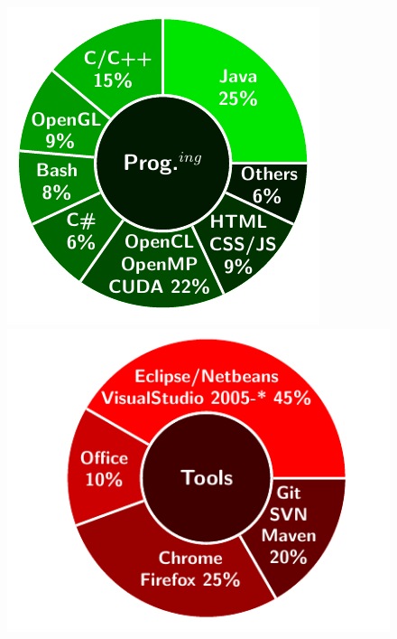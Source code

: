 

\begin{figure}[!htb]
\centering
\includegraphics[scale=0.834]{resume/pie_charts/pie_chart_programming.pdf} 
\includegraphics[scale=0.834]{resume/pie_charts/pie_chart_tools.pdf}

\end{figure}

